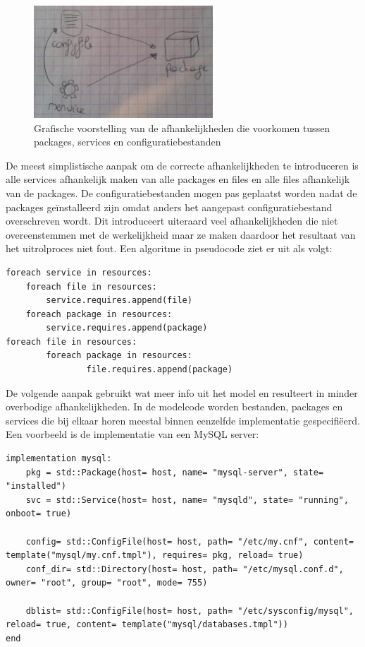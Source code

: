 \begin{figure}
    \label{fig:service_package_dep}
    \begin{center}
    \includegraphics[width=0.6\textwidth]{images/service_package_dep.png}
    \caption{Grafische voorstelling van de afhankelijkheden die voorkomen tussen packages, services en configuratiebestanden}
    \end{center}
\end{figure}

De meest simplistische aanpak om de correcte afhankelijkheden te introduceren is alle services afhankelijk maken van alle packages en files en alle files afhankelijk van de packages.
De configuratiebestanden mogen pas geplaatst worden nadat de packages ge\"installeerd zijn omdat anders het aangepast configuratiebestand overschreven wordt.
Dit introduceert uiteraard veel afhankelijkheden die niet overeenstemmen met de werkelijkheid maar ze maken daardoor het resultaat van het uitrolproces niet fout.
Een algoritme in pseudocode ziet er uit als volgt:
\begin{lstlisting}
foreach service in resources:
    foreach file in resources:
        service.requires.append(file)
    foreach package in resources:
        service.requires.append(package)
foreach file in resources:
		foreach package in resources:
				file.requires.append(package)
\end{lstlisting}

De volgende aanpak gebruikt wat meer info uit het model en resulteert in minder overbodige afhankelijkheden.
In de modelcode worden bestanden, packages en services die bij elkaar horen meestal binnen eenzelfde implementatie gespecifi\"eerd.
Een voorbeeld is de implementatie van een MySQL server:
\begin{lstlisting}
implementation mysql:
    pkg = std::Package(host= host, name= "mysql-server", state= "installed")
    svc = std::Service(host= host, name= "mysqld", state= "running", onboot= true)

    config= std::ConfigFile(host= host, path= "/etc/my.cnf", content= template("mysql/my.cnf.tmpl"), requires= pkg, reload= true)
    conf_dir= std::Directory(host= host, path= "/etc/mysql.conf.d", owner= "root", group= "root", mode= 755)

    dblist= std::ConfigFile(host= host, path= "/etc/sysconfig/mysql", reload= true, content= template("mysql/databases.tmpl"))
end
\end{lstlisting}

